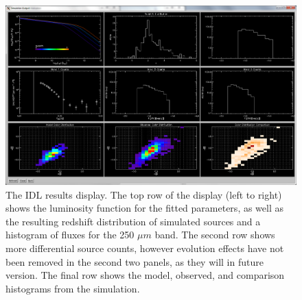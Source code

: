\documentclass[twocolumn,letterpaper,10pt]{article}
\begin{document}
\begin{figure}
  \includegraphics[width=\textwidth]{bestfit2.png}
  \caption{The IDL results display. The top row of the display (left to right) shows the luminosity function for the fitted parameters, as well as the resulting redshift distribution of simulated sources and a histogram of fluxes for the 250 $\mu m$ band. The second row shows more differential source counts, however evolution effects have not been removed in the second two panels, as they will in future version. The final row shows the model, observed, and comparison histograms from the simulation.}
  \label{disp:res}
\end{figure}
\end{document}
